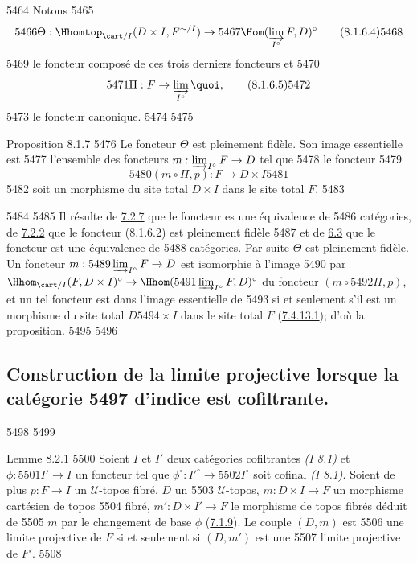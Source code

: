   5464	Notons
  5465	\begin{equation*}
  5466	\Theta : \Hhomtop_{\cart / I}(D \times I, F^{\sim / I}) \to
  5467	\Hom(\varinjlim_{I^{\circ}}F, D)^{\circ}\tag{8.1.6.4}
  5468	\end{equation*}
  5469	le foncteur composé de ces trois derniers foncteurs et
  5470	\begin{equation*}
  5471	\Pi : F \to \varinjlim_{I^{\circ}}{\quoi},\tag{8.1.6.5}
  5472	\end{equation*}
  5473	le foncteur canonique.
  5474	
  5475	\begin{enonce*}{Proposition 8.1.7}
  5476	Le foncteur $\Theta$ est pleinement fidèle. Son image essentielle est
  5477	l'ensemble des foncteurs $m : \varinjlim_{I^{\circ}}F \to D$ tel que
  5478	le foncteur
  5479	$$
  5480	(m \circ \Pi, p) : F \to D \times I
  5481	$$
  5482	soit un morphisme du site total $D \times I$ dans le site total $F$.
  5483	\end{enonce*}
  5484	
  5485	Il résulte de \hyperref[VI.prop7.2.7]{7.2.7} que le foncteur  es une équivalence de
  5486	catégories, de \hyperref[VI.subsubsec7.2.2]{7.2.2} que le foncteur (8.1.6.2) est pleinement fidèle
  5487	et de \hyperref[VI.def6.3]{6.3} que le foncteur  est une équivalence de
  5488	catégories. Par suite $\Theta$ est pleinement fidèle. Un foncteur $m :
  5489	\varinjlim_{I^{\circ}}F \to D$ est isomorphie à l'image
  5490	par $\Hhom_{\cart / I} (F, D \times I)^{\circ} \to \Hhom(
  5491	\varinjlim_{I^{\circ}}F, D)^{\circ}$ du foncteur $(m \circ
  5492	\Pi, p)$, et un tel foncteur est dans l'image essentielle de
  5493	 si et seulement s'il est un morphisme du site total $D
  5494	\times I$ dans le site total $F$ (\hyperref[VI.thm7.4.13.1]{7.4.13.1}); d'où la proposition.
  5495	
  5496	\subsection{Construction de la limite projective lorsque la catégorie
  5497	  d'indice est cofiltrante.}
  5498	
  5499	\begin{enonce*}{Lemme 8.2.1}
  5500	Soient $I$ et $I'$ deux catégories cofiltrantes \emph{(I 8.1)} et $\phi :
  5501	I'\to I$ un foncteur tel que $\phi^{\circ} : {I'}^{\circ} \to
  5502	I^{\circ}$ soit cofinal \emph{(I 8.1)}. Soient de plus $p : F \to I$ un $𝒰$-topos fibré, $D$ un
  5503	$𝒰$-topos, $m : D \times I \to F$ un morphisme cartésien de topos
  5504	fibré, $m': D \times I'\to F$ le morphisme de topos fibrés déduit de
  5505	$m$ par le changement de base $\phi$ (\hyperref[VI.subsubsec7.1.9]{7.1.9}). Le couple $(D, m)$ est
  5506	une limite projective de $F$ si et seulement si $(D, m')$ est une
  5507	limite projective de $F'$.
  5508	\end{enonce*}
